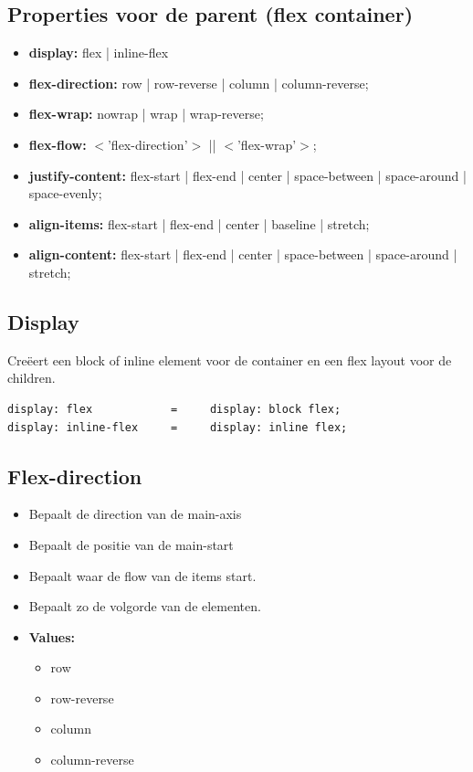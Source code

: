 \documentclass{article}
\newcommand{\bold}[1]{\textbf{#1}}
\begin{document}
\subsection{Properties voor de parent (flex container)}

\begin{itemize}
    \item \bold{display:} flex | inline-flex
    \item \bold{flex-direction:} row | row-reverse | column | column-reverse;
    \item \bold{flex-wrap:} nowrap | wrap | wrap-reverse;
    \item \bold{flex-flow:} $<$'flex-direction'$>$ || $<$'flex-wrap'$>$;
    \item \bold{justify-content:} flex-start | flex-end | center | space-between | space-around | space-evenly;
    \item \bold{align-items:} flex-start | flex-end | center | baseline | stretch;
    \item \bold{align-content:} flex-start | flex-end | center | space-between | space-around | stretch;
\end{itemize}

\subsection{Display}
Creëert een block of inline element voor de container en een flex layout voor de children.

\begin{lstlisting}
display: flex            =     display: block flex;
display: inline-flex     =     display: inline flex;
\end{lstlisting}

\subsection{Flex-direction}
\begin{itemize}
    \item Bepaalt de direction van de main-axis
    \item Bepaalt de positie van de main-start
    \item Bepaalt waar de flow van de items start.
    \item Bepaalt zo de volgorde van de elementen.
    \item \bold{Values:}
    \begin{itemize}
        \item row
        \item row-reverse
        \item column
        \item column-reverse
    \end{itemize}
\end{itemize}
\end{document}

